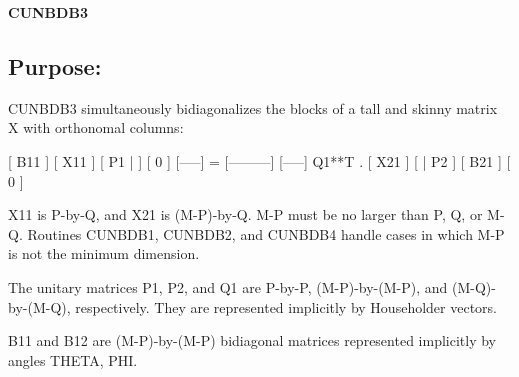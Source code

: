 {\bfseries C\+U\+N\+B\+D\+B3} 

\subsection*{Purpose\+: }

\begin{DoxyVerb} CUNBDB3 simultaneously bidiagonalizes the blocks of a tall and skinny
 matrix X with orthonomal columns:

                            [ B11 ]
      [ X11 ]   [ P1 |    ] [  0  ]
      [-----] = [---------] [-----] Q1**T .
      [ X21 ]   [    | P2 ] [ B21 ]
                            [  0  ]

 X11 is P-by-Q, and X21 is (M-P)-by-Q. M-P must be no larger than P,
 Q, or M-Q. Routines CUNBDB1, CUNBDB2, and CUNBDB4 handle cases in
 which M-P is not the minimum dimension.

 The unitary matrices P1, P2, and Q1 are P-by-P, (M-P)-by-(M-P),
 and (M-Q)-by-(M-Q), respectively. They are represented implicitly by
 Householder vectors.

 B11 and B12 are (M-P)-by-(M-P) bidiagonal matrices represented
 implicitly by angles THETA, PHI.\end{DoxyVerb}
 
